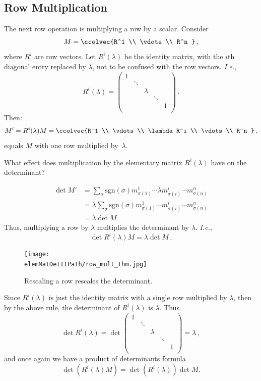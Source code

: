 \subsection{Row  Multiplication}
The next row operation is multiplying a row by a scalar.
Consider \[M=\ccolvec{R^1 \\ \vdots \\ R^n }\, ,\] where $R^i$ are row vectors.  Let $R^i(\lambda)$ be the identity matrix, with the $i$th diagonal entry replaced by $\lambda$, not to be confused with the row vectors. {\itshape I.e.},
\[
R^i(\lambda)=
\begin{pmatrix}
1 & & & & \\
  & \ddots & & & \\
  & & \lambda & & \\
  & & & \ddots & \\
  & & & & 1 \\
\end{pmatrix}
\, .\]
Then:
\[
M'=R^i(\lambda)M=\ccolvec{R^1 \\ \vdots \\ \lambda R^i \\ \vdots \\ R^n }\, ,
\]
equals $M$ with one row multiplied by~$\lambda$.

What effect does multiplication by the elementary matrix $R^i(\lambda)$ have on the determinant?

\begin{align*}
\det M' & = \sum_{\sigma} \text{sgn}(\sigma) m^1_{\sigma(1)}\cdots \lambda m^i_{\sigma(i)} \cdots m^n_{\sigma(n)} \\
& = \lambda \sum_{\sigma} \text{sgn}(\sigma) m^1_{\sigma(1)}\cdots m^i_{\sigma(i)} \cdots m^n_{\sigma(n)} \\
& = \lambda \det M
\end{align*}
Thus, multiplying a row by $\lambda$ multiplies the determinant by $\lambda$.
{\itshape I.e.,} \[\det R^i(\lambda) M = \lambda \det M\, .\]


\begin{figure}
\begin{center}
\texttt{[image: \\elemMatDetIIPath/row\_mult\_thm.jpg]}
\end{center}
\caption{Rescaling a row rescales the determinant.}
\end{figure}


Since $R^i(\lambda)$ is just the identity matrix with a single row multiplied by $\lambda$, then by the above rule, the determinant of $R^i(\lambda)$ is $\lambda$.  Thus
\[
\det R^i(\lambda) = \det \begin{pmatrix}
1 & & & & \\
  & \ddots & & & \\
  & & \lambda & & \\
  & & & \ddots & \\
  & & & & 1 \\
\end{pmatrix} = \lambda\, ,
\]
and once again we have a product of determinants formula
\[
\det \left( R^i(\lambda) M \right) = \det\left( R^i(\lambda) \right)\det M.
\]

